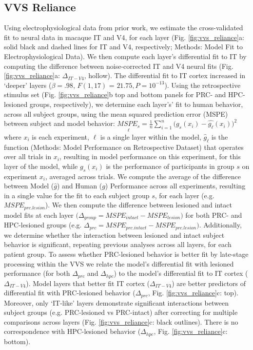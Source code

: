 \documentclass[11pt]{article}
\begin{document}
\subsection{VVS Reliance}

Using electrophysiological data from prior work\cite{majaj2015simple}, we estimate the cross-validated fit to neural data in macaque IT and V4, for each layer (Fig. \ref{fig:vvs_reliance}a:  solid black and dashed lines for IT and V4, respectively; Methods: Model Fit to Electrophysiological Data). We then compute each layer's differential fit to IT by computing the difference between noise-corrected IT and V4 neural fits (Fig. \ref{fig:vvs_reliance}a: $\Delta_{IT-V4}$, hollow). The differential fit to IT cortex increased in `deeper' layers ($\beta = .98$, $F(1, 17)$ = $21.75, P = 10^{-13}$). Using the retrospective stimulus set (Fig. \ref{fig:vvs_reliance}b top and bottom panels for PRC- and HPC-lesioned groups, respectively), we determine each layer's’ fit to human behavior, across all subject groups, using the mean squared prediction error (MSPE) between subject and model behavior:
$\underset{\ell}{MSPE_{s}} = \frac{1}{n}\sum_{i=1}^{n} \big(g_{s}(x_{i}) - \hat{g_{\ell}}(x_{i}) \big)^{2}$
where $x_{i}$ is each experiment, $\ell$ is a single layer within the model, $\hat{g}_{\ell}$ is the function (Methods: Model Performance on Retrospective Dataset) that operates over all trials in  $x_{i}$, resulting in model performance on this experiment, for this layer of the model, while $g_{s}(x_{i})$ is the performance of participants in group $s$ on experiment $x_{i}$, averaged across trials. We compute the average of the difference between Model ($\hat{g}$) and Human ($g$) Performance across all experiments, resulting in a single value for the fit to each subject group $s$, for each layer (e.g. $MSPE_{prc.lesion}$). We then compute the difference between lesioned and intact model fits at each layer $\big(\Delta_{group} = MSPE_{intact}-MSPE_{lesion}\big)$ for both PRC- and HPC-lesioned groups (e.g. $\Delta_{prc} = MSPE_{prc.intact}-MSPE_{prc.lesion}\big)$. Additionally, we determine whether the interaction between lesioned and intact subject behavior is significant, repeating previous analyses across all layers, for each patient group. To assess whether PRC-lesioned behavior is better fit by late-stage processing within the VVS we relate the model's differential fit with lesioned performance (for both $\Delta_{prc}$ and $\Delta_{hpc}$) to the model's differential fit to IT cortex ($\Delta_{IT-V4}$). Model layers that better fit IT cortex ($\Delta_{IT-V4}$) are better predictors of differential fit with PRC-lesioned behavior ($\Delta_{prc}$, Fig. \ref{fig:vvs_reliance}c: top). Moreover, only `IT-like' layers demonstrate significant interactions between subject groups (e.g. PRC-lesioned vs PRC-intact) after correcting for multiple comparisons across layers (Fig. \ref{fig:vvs_reliance}c: black outlines). There is no correspondence with HPC-lesioned behavior ($\Delta_{hpc}$, Fig. \ref{fig:vvs_reliance}c: bottom).
\end{document}
